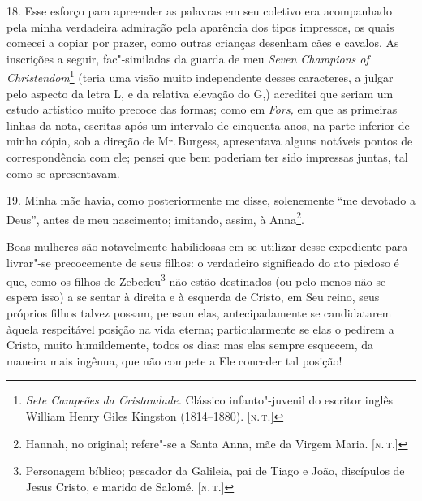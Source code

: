 18. Esse esforço para apreender as palavras em seu coletivo era
acompanhado pela minha verdadeira admiração pela aparência dos tipos
impressos, os quais comecei a copiar por prazer, como outras crianças
desenham cães e cavalos. As inscrições a seguir, fac"-similadas da guarda
de meu \emph{Seven Champions of Christendom}\footnote{\emph{Sete
  Campeões da Cristandade.} Clássico infanto"-juvenil do escritor inglês
  William Henry Giles Kingston (1814--1880). {[}\textsc{n.\,t.}{]}} (teria uma
visão muito independente desses caracteres, a julgar pelo aspecto da
letra L, e da relativa elevação do G,) acreditei que seriam um estudo
artístico muito precoce das formas; como em \emph{Fors,} em que as
primeiras linhas da nota, escritas após um intervalo de cinquenta anos,
na parte inferior de minha cópia, sob a direção de Mr.\,Burgess,
apresentava alguns notáveis pontos de correspondência com ele; pensei
que bem poderiam ter sido impressas juntas, tal como se apresentavam.

19. Minha mãe havia, como posteriormente me disse, solenemente ``me
devotado a Deus'', antes de meu nascimento; imitando, assim, à
Anna\footnote{Hannah, no original; refere"-se a Santa Anna, mãe da Virgem
  Maria. {[}\textsc{n.\,t.}{]}}.

Boas mulheres são notavelmente habilidosas em se utilizar desse
expediente para livrar"-se precocemente de seus filhos: o verdadeiro
significado do ato piedoso é que, como os filhos de Zebedeu\footnote{Personagem
  bíblico; pescador da Galileia, pai de Tiago e João, discípulos de
  Jesus Cristo, e marido de Salomé. {[}\textsc{n.\,t.}{]}} não estão destinados
(ou pelo menos não se espera isso) a se sentar à direita e à esquerda de
Cristo, em Seu reino, seus próprios filhos talvez possam, pensam elas,
antecipadamente se candidatarem àquela respeitável posição na vida
eterna; particularmente se elas o pedirem a Cristo, muito humildemente,
todos os dias: mas elas sempre esquecem, da maneira mais ingênua, que
não compete a Ele conceder tal posição!

